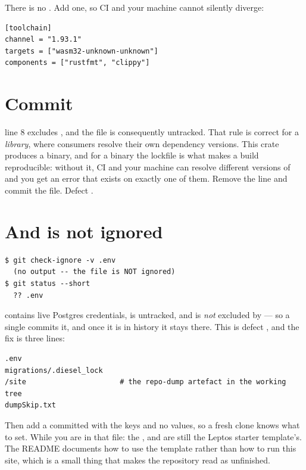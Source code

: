 \begin{pattern}
There is no . Add one, so CI and your machine cannot silently diverge:
\begin{lstlisting}[style=toml]
[toolchain]
channel = "1.93.1"
targets = ["wasm32-unknown-unknown"]
components = ["rustfmt", "clippy"]
\end{lstlisting}
\end{pattern}

\section{Commit }

 line 8 excludes , and the file is consequently untracked. That
rule is correct for a \emph{library}, where consumers resolve their own dependency versions. This
crate produces a binary, and for a binary the lockfile is what makes a build reproducible: without
it, CI and your machine can resolve different versions of  and you get an error that
exists on exactly one of them. Remove the line and commit the file. Defect .

\section{And  is not ignored}

\begin{verified}
\begin{lstlisting}[style=out]
$ git check-ignore -v .env
  (no output -- the file is NOT ignored)
$ git status --short
  ?? .env
\end{lstlisting}
\end{verified}

 contains live Postgres credentials, is untracked, and is \emph{not} excluded by
 --- so a single  commits it, and once it is in history it stays
there. This is defect , and the fix is three lines:

\begin{lstlisting}[style=sh,caption={Additions to \file{.gitignore}.}]
.env
migrations/.diesel_lock
/site                      # the repo-dump artefact in the working tree
dumpSkip.txt
\end{lstlisting}

Then add a committed  with the keys and no values, so a fresh clone knows what
to set. While you are in that file: the ,  and  are
still the Leptos starter template's. The README documents how to use the template rather than how to
run this site, which is a small thing that makes the repository read as unfinished.

